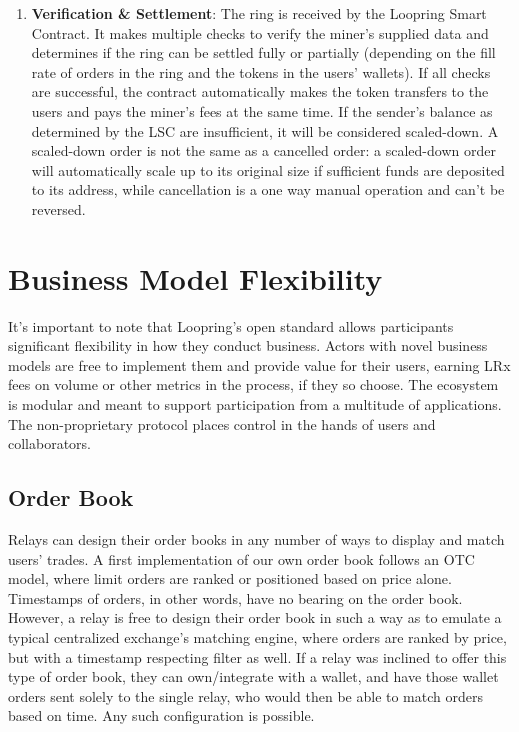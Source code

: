 \documentclass[UTF8,nofonts]{article}
\begin{document}
\begin{multicols}{2}
\begin{enumerate}
\item \textbf{Verification \& Settlement}: The ring is received by the Loopring Smart Contract. It makes multiple checks to verify the miner's supplied data and determines if the ring can be settled fully or partially (depending on the fill rate of orders in the ring and the tokens in the users' wallets). If all checks are successful, the contract automatically makes the token transfers to the users and pays the miner's fees at the same time. If the sender's balance as determined by the LSC are insufficient, it will be considered scaled-down. A scaled-down order is not the same as a cancelled order: a scaled-down order will automatically scale up to its original size if sufficient funds are deposited to its address, while cancellation is a one way manual operation and can't be reversed.

\end{enumerate}

\section{Business Model Flexibility\label{sec:business_model}}
It's important to note that Loopring's open standard allows participants significant flexibility in how they conduct business. Actors with novel business models are free to implement them and provide value for their users, earning LRx fees on volume or other metrics in the process, if they so choose. The ecosystem is modular and meant to support participation from a multitude of applications. The non-proprietary protocol places control in the hands of users and collaborators.

\subsection{Order Book\label{sec:order_book}}
Relays can design their order books in any number of ways to display and match users' trades. A first implementation of our own order book follows an OTC model, where limit orders are ranked or positioned based on price alone. Timestamps of orders, in other words, have no bearing on the order book. However, a relay is free to design their order book in such a way as to emulate a typical centralized exchange's matching engine, where orders are ranked by price, but with a timestamp respecting filter as well. If a relay was inclined to offer this type of order book, they can own/integrate with a wallet, and have those wallet orders sent solely to the single relay, who would then be able to match orders based on time. Any such configuration is possible. 


\end{multicols}
\end{document}
